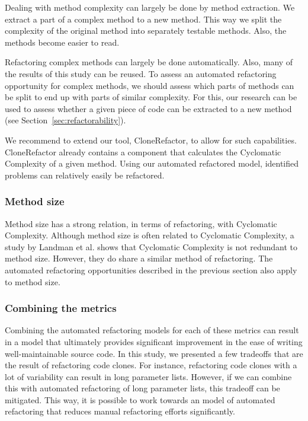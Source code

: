 Dealing with method complexity can largely be done by method extraction. We extract a part of a complex method to a new method. This way we split the complexity of the original method into separately testable methods. Also, the methods become easier to read.

Refactoring complex methods can largely be done automatically. Also, many of the results of this study can be reused. To assess an automated refactoring opportunity for complex methods, we should assess which parts of methods can be split to end up with parts of similar complexity. For this, our research can be used to assess whether a given piece of code can be extracted to a new method (see Section~\ref{sec:refactorability}).

We recommend to extend our tool, CloneRefactor, to allow for such capabilities. CloneRefactor already contains a component that calculates the Cyclomatic Complexity of a given method. Using our automated refactored model, identified problems can relatively easily be refactored.

\subsubsection{Method size}
Method size has a strong relation, in terms of refactoring, with Cyclomatic Complexity. Although method size is often related to Cyclomatic Complexity, a study by Landman et al. \cite{landman2016empirical} shows that Cyclomatic Complexity is not redundant to method size. However, they do share a similar method of refactoring. The automated refactoring opportunities described in the previous section also apply to method size.

\subsubsection{Combining the metrics}
Combining the automated refactoring models for each of these metrics can result in a model that ultimately provides significant improvement in the ease of writing well-maintainable source code. In this study, we presented a few tradeoffs that are the result of refactoring code clones. For instance, refactoring code clones with a lot of variability can result in long parameter lists. However, if we can combine this with automated refactoring of long parameter lists, this tradeoff can be mitigated. This way, it is possible to work towards an model of automated refactoring that reduces manual refactoring efforts significantly.

